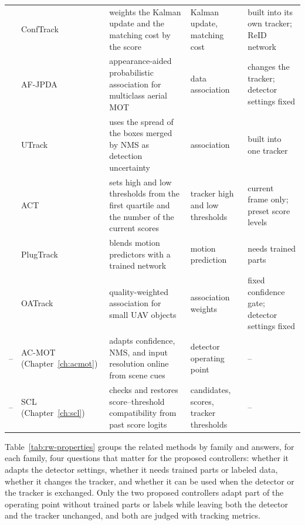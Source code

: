 \begin{table}[tbp]
\begin{tabular}{>{\raggedright\arraybackslash}p{0.8cm}>{\raggedright\arraybackslash}p{2.3cm}>{\raggedright\arraybackslash}p{4.8cm}>{\raggedright\arraybackslash}p{2.5cm}>{\raggedright\arraybackslash}p{3.6cm}}
2024 & ConfTrack \cite{jung2024conftrack} & weights the Kalman update and the matching cost by the score & Kalman update, matching cost & built into its own tracker; ReID network \\
2024 & AF-JPDA \cite{kim2024afjpda} & appearance-aided probabilistic association for multiclass aerial MOT & data association & changes the tracker; detector settings fixed \\
2025 & UTrack \cite{solano2025utrack} & uses the spread of the boxes merged by NMS as detection uncertainty & association & built into one tracker \\
2026 & ACT \cite{act2026adaptive} & sets high and low thresholds from the first quartile and the number of the current scores & tracker high and low thresholds & current frame only; preset score levels \\
2026 & PlugTrack \cite{kim2026plugtrack} & blends motion predictors with a trained network & motion prediction & needs trained parts \\
2026 & OATrack \cite{qi2026oatrack} & quality-weighted association for small UAV objects & association weights & fixed confidence gate; detector settings fixed \\
\midrule
-- & AC-MOT (Chapter~\ref{ch:acmot}) & adapts confidence, NMS, and input resolution online from scene cues & detector operating point & -- \\
-- & SCL (Chapter~\ref{ch:scl}) & checks and restores score--threshold compatibility from past score logits & candidates, scores, tracker thresholds & -- \\
\bottomrule
\end{tabular}
\end{table}

Table~\ref{tab:rw-properties} groups the related methods by family and answers, for each family, four questions that matter for the proposed controllers: whether it adapts the detector settings, whether it needs trained parts or labeled data, whether it changes the tracker, and whether it can be used when the detector or the tracker is exchanged. Only the two proposed controllers adapt part of the operating point without trained parts or labels while leaving both the detector and the tracker unchanged, and both are judged with tracking metrics.

